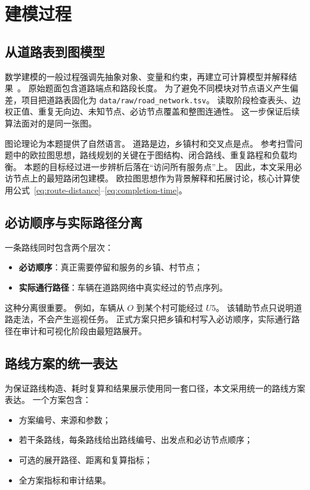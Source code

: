 \documentclass[a4paper, 12pt]{article}
\begin{document}
\section{建模过程}

\subsection{从道路表到图模型}

数学建模的一般过程强调先抽象对象、变量和约束，再建立可计算模型并解释结果~\cite{tan2019}。
原始题面包含道路端点和路段长度。
为了避免不同模块对节点语义产生偏差，项目把道路表固化为
\texttt{data/raw/road\_network.tsv}。
读取阶段检查表头、边权正值、重复无向边、未知节点、必访节点覆盖和整图连通性。
这一步保证后续算法面对的是同一张图。

图论理论为本题提供了自然语言。
道路是边，乡镇村和交叉点是点。
参考扫雪问题中的欧拉图思想，路线规划的关键在于图结构、闭合路线、重复路程和负载均衡。
本题的目标经过进一步辨析后落在“访问所有服务点”上。
因此，本文采用必访节点上的最短路闭包建模。
欧拉图思想作为背景解释和拓展讨论，核心计算使用公式~\eqref{eq:route-distance}--\eqref{eq:completion-time}。

\subsection{必访顺序与实际路径分离}

一条路线同时包含两个层次：
\begin{itemize}[leftmargin=2em]
    \item \textbf{必访顺序}：真正需要停留和服务的乡镇、村节点；
    \item \textbf{实际通行路径}：车辆在道路网络中真实经过的节点序列。
\end{itemize}

这种分离很重要。
例如，车辆从 $O$ 到某个村可能经过 $U5$。
该辅助节点只说明道路走法，不会产生巡视任务。
正式方案只把乡镇和村写入必访顺序，实际通行路径在审计和可视化阶段由最短路展开。

\subsection{路线方案的统一表达}

为保证路线构造、耗时复算和结果展示使用同一套口径，本文采用统一的路线方案表达。
一个方案包含：
\begin{itemize}[leftmargin=2em]
    \item 方案编号、来源和参数；
    \item 若干条路线，每条路线给出路线编号、出发点和必访节点顺序；
    \item 可选的展开路径、距离和复算指标；
    \item 全方案指标和审计结果。
\end{itemize}
\end{document}
